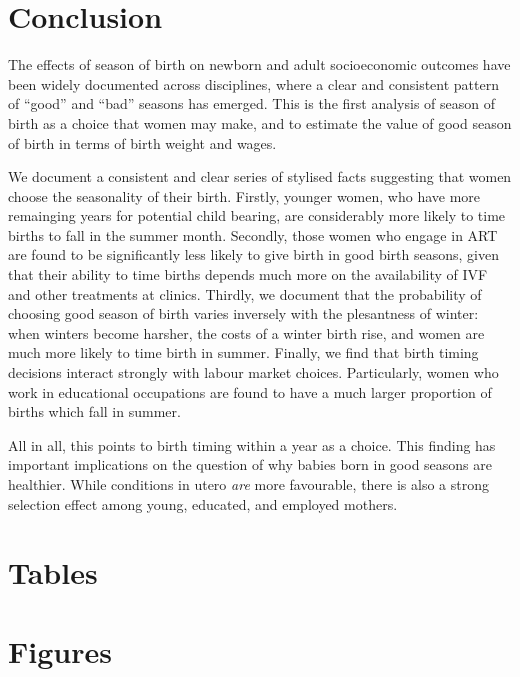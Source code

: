 \documentclass[a4paper, 12 pt]{article}
\theoremstyle{plain}
\begin{document}
\begin{doublespace}
\section{Conclusion}
The effects of season of birth on newborn and adult socioeconomic outcomes have been widely documented across disciplines, where a clear and consistent pattern of ``good'' and ``bad'' seasons has emerged. This is the first analysis of season of birth as a choice that women may make, and to estimate the value of good season of birth in terms of birth weight and wages.

We document a consistent and clear series of stylised facts suggesting that women choose the seasonality of their birth.  Firstly, younger women, who have more remainging years for potential child bearing, are considerably more likely to time births to fall in the summer month.  Secondly, those women who engage in ART are found to be significantly less likely to give birth in good birth seasons, given that their ability to time births depends much more on the availability of IVF and other treatments at clinics.  Thirdly, we document that the probability of choosing good season of birth varies inversely with the plesantness of winter: when winters become harsher, the costs of a winter birth rise, and women are much more likely to time birth in summer. Finally, we find that birth timing decisions interact strongly with labour market choices.  Particularly, women who work in educational occupations are found to have a much larger proportion of births which fall in summer.

All in all, this points to birth timing within a year as a choice.  This finding has important implications on the question of why babies born in good seasons are healthier.  While conditions in utero \emph{are} more favourable, there is also a strong selection effect among young, educated, and employed mothers.

\newpage




\newpage
\section*{Tables}


\newpage
\section*{Figures}


\clearpage

\end{doublespace}
\end{document}
